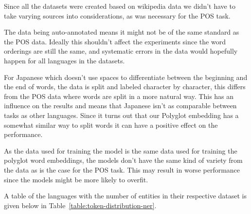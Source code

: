Since all the datasets were created based on wikipedia data we didn't have to
take varying sources into considerations, as was necessary for the POS task.

The data being auto-annotated means it might not be of the same standard as the
POS data. Ideally this shouldn't affect the experiments since the word orderings
are still the same, and systematic errors in the data would hopefully happen for
all languages in the datasets.

For Japanese which doesn't use spaces to differentiate between the beginning and
the end of words, the data is split and labeled character by character, this
differs from the POS data where words are split in a more natural way. This has
an influence on the results and means that Japanese isn't as comparable between
tasks as other languages. Since it turns out that our Polyglot embedding has a
somewhat similar way to split words it can have a positive effect on the
performance.

As the data used for training the model is the same data used for training the
polyglot word embeddings, the models don't have the same kind of variety from
the data as is the case for the POS task. This may result in worse performance
since the models might be more likely to overfit.

A table of the languages with the number of entities in their respective dataset
is given below in Table~\ref{table:token-distribution-ner}.

